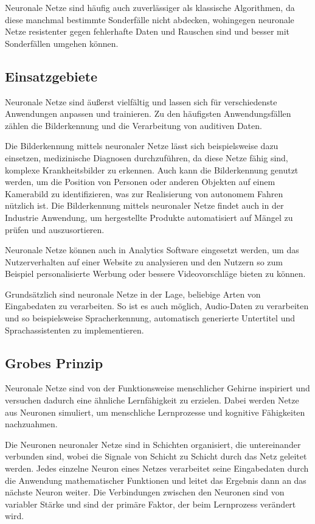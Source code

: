 \bigbreak\noindent
Neuronale Netze sind häufig auch zuverlässiger als klassische Algorithmen, da diese manchmal bestimmte Sonderfälle nicht abdecken, wohingegen neuronale Netze resistenter gegen fehlerhafte Daten und Rauschen sind und besser mit Sonderfällen umgehen können.

\subsection{Einsatzgebiete}\label{subsec:einleitung_nn:einsatzgebiete}
Neuronale Netze sind äußerst vielfältig und lassen sich für verschiedenste Anwendungen anpassen und trainieren.
Zu den häufigsten Anwendungsfällen zählen die Bilderkennung und die Verarbeitung von auditiven Daten.

\bigbreak\noindent
Die Bilderkennung mittels neuronaler Netze lässt sich beispielsweise dazu einsetzen, medizinische Diagnosen durchzuführen, da diese Netze fähig sind, komplexe Krankheitsbilder zu erkennen.
Auch kann die Bilderkennung genutzt werden, um die Position von Personen oder anderen Objekten auf einem Kamerabild zu identifizieren, was zur Realisierung von autonomem Fahren nützlich ist.
Die Bilderkennung mittels neuronaler Netze findet auch in der Industrie Anwendung, um hergestellte Produkte automatisiert auf Mängel zu prüfen und auszusortieren.

\bigbreak\noindent
Neuronale Netze können auch in Analytics Software eingesetzt werden, um das Nutzerverhalten auf einer Website zu analysieren und den Nutzern so zum Beispiel personalisierte Werbung oder bessere Videovorschläge bieten zu können.

\bigbreak\noindent
Grundsätzlich sind neuronale Netze in der Lage, beliebige Arten von Eingabedaten zu verarbeiten.
So ist es auch möglich, Audio-Daten zu verarbeiten und so beispielsweise Spracherkennung, automatisch generierte Untertitel und Sprachassistenten zu implementieren.

\subsection{Grobes Prinzip}\label{subsec:einleitung_nn_grobes:prinzip}
Neuronale Netze sind von der Funktionsweise menschlicher Gehirne inspiriert und versuchen dadurch eine ähnliche Lernfähigkeit zu erzielen.
Dabei werden Netze aus Neuronen simuliert, um menschliche Lernprozesse und kognitive Fähigkeiten nachzuahmen. 

\bigbreak\noindent
Die Neuronen neuronaler Netze sind in Schichten organisiert, die untereinander verbunden sind, wobei die Signale von Schicht zu Schicht durch das Netz geleitet werden.
Jedes einzelne Neuron eines Netzes verarbeitet seine Eingabedaten durch die Anwendung mathematischer Funktionen und leitet das Ergebnis dann an das nächste Neuron weiter.
Die Verbindungen zwischen den Neuronen sind von variabler Stärke und sind der primäre Faktor, der beim Lernprozess verändert wird.

